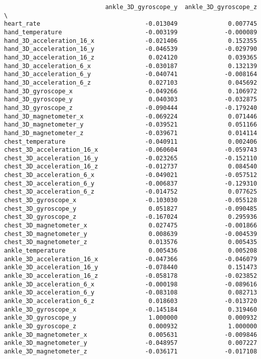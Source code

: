 \documentclass[11pt]{article}
\begin{document}
\begin{verbatim}
                            ankle_3D_gyroscope_y  ankle_3D_gyroscope_z  \
heart_rate                             -0.013049              0.007745   
hand_temperature                       -0.003199             -0.000089   
hand_3D_acceleration_16_x              -0.021406              0.152355   
hand_3D_acceleration_16_y              -0.046539             -0.029790   
hand_3D_acceleration_16_z               0.024120              0.039365   
hand_3D_acceleration_6_x               -0.030187              0.132139   
hand_3D_acceleration_6_y               -0.040741             -0.008164   
hand_3D_acceleration_6_z                0.027103              0.045692   
hand_3D_gyroscope_x                    -0.049266              0.106972   
hand_3D_gyroscope_y                     0.040303             -0.032875   
hand_3D_gyroscope_z                    -0.090444             -0.179240   
hand_3D_magnetometer_x                 -0.069224              0.071446   
hand_3D_magnetometer_y                 -0.039521              0.051166   
hand_3D_magnetometer_z                 -0.039671              0.014114   
chest_temperature                      -0.040911              0.002406   
chest_3D_acceleration_16_x             -0.060604             -0.059743   
chest_3D_acceleration_16_y             -0.023265             -0.152110   
chest_3D_acceleration_16_z             -0.012737              0.084540   
chest_3D_acceleration_6_x              -0.049021             -0.057512   
chest_3D_acceleration_6_y              -0.006837             -0.129310   
chest_3D_acceleration_6_z              -0.014752              0.077625   
chest_3D_gyroscope_x                   -0.103030             -0.055128   
chest_3D_gyroscope_y                    0.051827             -0.090485   
chest_3D_gyroscope_z                   -0.167024              0.295936   
chest_3D_magnetometer_x                 0.027475             -0.001866   
chest_3D_magnetometer_y                 0.008639             -0.004539   
chest_3D_magnetometer_z                 0.013576              0.005435   
ankle_temperature                       0.005436              0.005208   
ankle_3D_acceleration_16_x             -0.047366             -0.046079   
ankle_3D_acceleration_16_y             -0.078440              0.151473   
ankle_3D_acceleration_16_z             -0.058178             -0.023852   
ankle_3D_acceleration_6_x              -0.000198             -0.089616   
ankle_3D_acceleration_6_y              -0.083108              0.082713   
ankle_3D_acceleration_6_z               0.018603             -0.013720   
ankle_3D_gyroscope_x                   -0.145184              0.319460   
ankle_3D_gyroscope_y                    1.000000              0.000932   
ankle_3D_gyroscope_z                    0.000932              1.000000   
ankle_3D_magnetometer_x                 0.005631             -0.009846   
ankle_3D_magnetometer_y                -0.048957              0.007227   
ankle_3D_magnetometer_z                -0.036171             -0.017108   


\end{verbatim}
\end{document}
